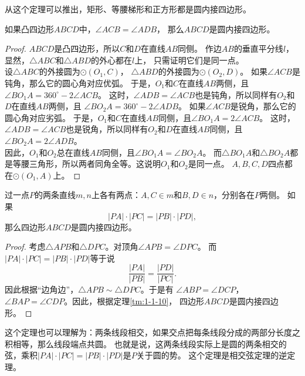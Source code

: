 \documentclass[12pt,UTF8,fontset=none]{ctexbook}
\begin{document}
从这个定理可以推出，矩形、等腰梯形和正方形都是圆内接四边形。

\begin{tm}\label{tm:1-1-10}
    如果凸四边形$ABCD$中，$\angle ACB = \angle ADB$，
    那么$ABCD$是圆内接四边形。
\end{tm}

\begin{proof}
    $ABCD$是凸四边形，所以$C$和$D$在直线$AB$同侧。
    作边$AB$的垂直平分线$l$，显然，$\triangle ABC$和$\triangle ABD$的外心都在$l$上，
    只需证明它们是同一点。\\
    设$\triangle ABC$的外接圆为$\odot{(O_1, C)}$，
    $\triangle ABD$的外接圆为$\odot{(O_2, D)}$。
    如果$\angle ACB$是钝角，那么它的圆心角对应优弧。
    于是，$O_1$和$C$在直线$AB$两侧，且$\angle BO_1A = 360^\circ - 2\angle ACB$。
    这时，$\angle ADB = \angle ACB$也是钝角，所以同样有$O_2$和$D$在直线$AB$两侧，且
    $\angle BO_2A = 360^\circ - 2\angle ADB$。
    如果$\angle ACB$是锐角，那么它的圆心角对应劣弧。
    于是，$O_1$和$C$在直线$AB$同侧，且$\angle BO_1A = 2\angle ACB$。
    这时，$\angle ADB = \angle ACB$也是锐角，所以同样有$O_2$和$D$在直线$AB$同侧，且
    $\angle BO_2A = 2\angle ADB$。\\
    因此，$O_1$和$O_2$总在直线$AB$同侧，且$\angle BO_1A = \angle BO_2A$。
    而$\triangle BO_1A$和$\triangle BO_2A$都是等腰三角形，所以两者同角全等。这说明$O_1$和$O_2$是同一点。
    $A,B,C,D$四点都在$\odot{(O_1, A)}$上。
\end{proof}

\begin{tm}\label{tm:1-1-20}
    过一点$P$的两条直线$m,n$上各有两点：$A, C\in m$和$B, D \in n$，分别各在$P$两侧。
    如果
    $$ |PA| \cdot |PC| = |PB| \cdot |PD|, $$
    那么四边形$ABCD$是圆内接四边形。
\end{tm}

\begin{proof}
    考虑$\triangle APB$和$\triangle DPC$。对顶角$\angle APB = \angle DPC$。
    而$ |PA| \cdot |PC| = |PB| \cdot |PD|$等于说
    $$ \frac{|PA|}{|PB|} = \frac{|PD|}{|PC|}.$$
    因此根据“边角边”，$\triangle APB \sim \triangle DPC$。于是有
    $\angle ABP = \angle DCP$，$\angle BAP = \angle CDP$。因此，根据定理\ref{tm:1-1-10}，
    四边形$ABCD$是圆内接四边形。
\end{proof}
这个定理也可以理解为：两条线段相交，如果交点把每条线段分成的两部分长度之积相等，那么线段端点共圆。
也就是说，这两条线段实际上是圆的两条相交的弦，乘积$ |PA| \cdot |PC| = |PB| \cdot |PD|$是$P$关于圆的势。
这个定理是相交弦定理的逆定理。
\end{document}
